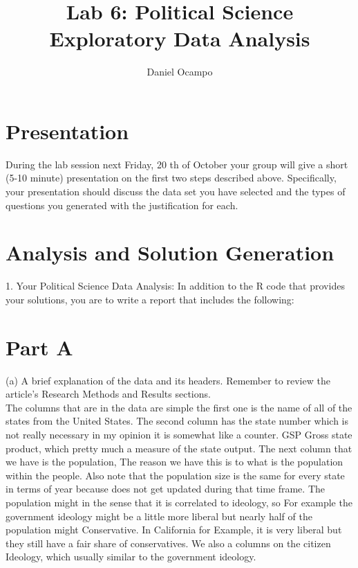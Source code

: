 \documentclass[11pt]{article}
\begin{document}
%
\author{Daniel Ocampo   }
\title{Lab 6: Political Science Exploratory Data Analysis}
\maketitle

\section{Presentation}
During the lab session next Friday, 20 th of October your group will give a short (5-10
minute) presentation on the first two steps described above. Specifically, your presentation
should discuss the data set you have selected and the types of questions you generated with the
justification for each.
\section{Analysis and Solution Generation}

1. Your Political Science Data Analysis: In addition to the R code that provides your
solutions, you are to write a report that includes the following:\\
\section{Part A}

(a) A brief explanation of the data and its headers. Remember to review the article’s
Research Methods and Results sections.\\

The columns that are in the data are simple the first one is the name of all of the states from the United States. The second column has the state number which is not really necessary in my opinion it is somewhat like a counter. GSP Gross state product, which pretty much a measure of the state output. The next column that we have is the population, The reason we have this is to what is the population within the people. Also note that the population size is the same for every state in terms of year because does not get updated during that time frame. The population might in the sense that it is correlated to ideology, so For example the government ideology might be  a little more liberal but nearly half of the population might Conservative. In California for Example, it is very liberal but they still have a fair share of conservatives. We also a columns on the citizen Ideology, which usually similar to the government ideology. \\
\end{document}
